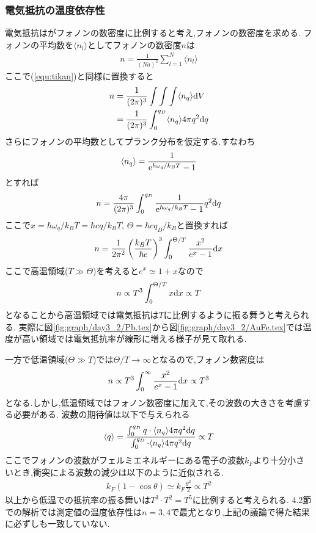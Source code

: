 \subsubsection{電気抵抗の温度依存性}
電気抵抗はがフォノンの数密度に比例すると考え,フォノンの数密度を求める.
フォノンの平均数を$\langle n_l\rangle$としてフォノンの数密度$n$は
\begin{align}
  n=\frac{1}{(Na)^3}\sum_{l=1}^N\langle n_l\rangle
\end{align}
ここで(\ref{equ:tikan})と同様に置換すると
\begin{align}
  \begin{split}
    n&=\frac{1}{(2\pi)^3}\int\int\int\langle n_q\rangle{\rm d}V\\
    &=\frac{1}{(2\pi)^3}\int_0^{q_D}\langle n_q\rangle4\pi q^2{\rm d}q
  \end{split}
\end{align}
さらにフォノンの平均数としてプランク分布を仮定する.すなわち
\begin{align}
  \langle n_q\rangle=\frac{1}{{\rm e}^{\hbar\omega_q/k_BT}-1}
\end{align}
とすれば
\begin{align}
  n=\frac{4\pi}{(2\pi)^3}\int_0^{q_D}\frac{1}{{\rm e}^{\hbar\omega_q/k_BT}-1} q^2{\rm d}q
\end{align}
ここで$x=\hbar\omega_q/k_BT=\hbar cq/k_BT$, $\Theta=\hbar cq_D/k_B$と置換すれば
\begin{align}
  n=\frac{1}{2\pi^2}\left(\frac{k_BT}{\hbar c}\right)^3\int_0^{\Theta/T}\frac{x^2}{e^x-1}{\rm d}x
\end{align}
ここで高温領域($T\gg\Theta$)を考えると$e^x\simeq1+x$なので
\begin{align}
  n\propto T^3\int_0^{\Theta/T}x{\rm d}x\propto T
\end{align}
となることから高温領域では電気抵抗は$T$に比例するように振る舞うと考えられる.
実際に図\ref{fig:graph/day3_2/Pb.tex}から図\ref{fig:graph/day3_2/AuFe.tex}では温度が高い領域では電気抵抗率が線形に増える様子が見て取れる.

一方で低温領域($\Theta\gg T$)では$\Theta/T\rightarrow\infty$となるので,フォノン数密度は
\begin{align}
  n\propto T^3\int^\infty_0\frac{x^2}{e^x-1}{\rm d}x\propto T^3
\end{align}
となる.しかし,低温領域ではフォノン数密度に加えて,その波数の大きさを考慮する必要がある.
波数の期待値は以下で与えられる
\begin{align}
  \langle q\rangle=\frac{\int^{q_D}_0q\cdot\langle n_q\rangle4\pi q^2{\rm d}q}{\int^{q_D}_0\cdot\langle n_q\rangle4\pi q^2{\rm d}q}\propto T
\end{align}
ここでフォノンの波数がフェルミエネルギーにある電子の波数$k_F$より十分小さいとき,衝突による波数の減少は以下のように近似される.\cite{text}
\begin{align}
  k_F(1-\cos\theta)\simeq k_F\frac{\theta^2}{2}\propto T^2
\end{align}
以上から低温での抵抗率の振る舞いは$T^3\cdot T^2=T^5$に比例すると考えられる.
4.2節での解析では測定値の温度依存性は$n=3,4$で最尤となり,上記の議論で得た結果に必ずしも一致していない.
